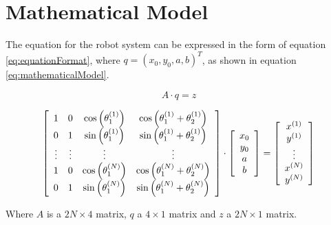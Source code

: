 \section{Mathematical Model}

The equation for the robot system can be expressed in the form of equation \ref{eq:equationFormat}, where $q = (x_0, y_0, a, b)^T$, as shown in equation \ref{eq:mathematicalModel}.

\begin{equation}
A \cdot q = z
\label{eq:equationFormat}
\end{equation}

\begin{equation}
\left[
\begin{array}{c c c c}
1 & 0 & \cos\left( \theta_1^{(1)}\right)  & \cos\left(\theta_1^{(1)} + \theta_2^{(1)} \right) \\
0 & 1 & \sin\left(\theta_1^{(1)}\right)  & \sin\left(\theta_1^{(1)} + \theta_2^{(1)}\right)  \\
\vdots & \vdots & \vdots & \vdots \\
1 & 0 & \cos\left(\theta_1^{(N)}\right)  & \cos\left(\theta_1^{(N)} + \theta_2^{(N)}\right)  \\
0 & 1 & \sin\left(\theta_1^{(N)}\right)  & \sin\left(\theta_1^{(N)} + \theta_2^{(N)}\right)  \\
\end{array}
\right]
\cdot
\left[
\begin{array}{c}
x_0 \\
y_0 \\
a \\
b \\
\end{array}
\right]
=
\left[
\begin{array}{c}
x^{(1)} \\
y^{(1)} \\
\vdots \\
x^{(N)} \\
y^{(N)} \\
\end{array}
\right]
\label{eq:mathematicalModel}
\end{equation}

Where $A$ is a $2 N \times 4$ matrix, $q$ a $4 \times 1$ matrix and $z$ a $2 N \times 1$ matrix.